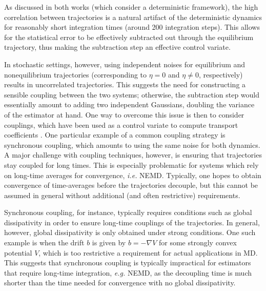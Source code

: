 As discussed in both works \cite{ciccotti75,ciccotti79} (which consider a deterministic framework), the high correlation between trajectories is a natural artifact of the deterministic dynamics for reasonably short integration times (around 200 integration steps). This allows for the statistical error to be effectively subtracted out through the equilibrium trajectory, thus making the subtraction step an effective control variate.

In stochastic settings, however, using independent noises for equilibrium and nonequilibrium trajectories (corresponding to $\eta=0$ and $\eta\ne 0$, respectively) results in uncorrelated trajectories. This suggests the need for constructing a sensible coupling between the two systems; otherwise, the subtraction step would essentially amount to adding two independent Gaussians, doubling the variance of the estimator at hand. One way to overcome this issue is then to consider couplings, which have been used as a control variate to compute transport coefficients \cite{goodman2009,garnier2022}. One particular example of a common coupling strategy is synchronous coupling, which amounts to using the same noise for both dynamics. A major challenge with coupling techniques, however, is ensuring that trajectories stay coupled for long times.
This is especially problematic for systems which rely on long-time averages for convergence, \emph{i.e.} NEMD. Typically, one hopes to obtain convergence of time-averages before the trajectories decouple, but this cannot be assumed in general without additional (and often restrictive) requirements.

Synchronous coupling, for instance, typically requires conditions such as global dissipativity in order to ensure long-time couplings of the trajectories. In general, however, global dissipativity is only obtained under strong conditions. One such example is when the drift $b$ is given by $b=-\nabla V$ for some strongly convex potential $V$, which is too restrictive a requirement for actual applications in MD. This suggests that synchronous coupling is typically impractical for estimators that require long-time integration, \emph{e.g.} NEMD, as the decoupling time is much shorter than the time needed for convergence with no global dissipativity. %

